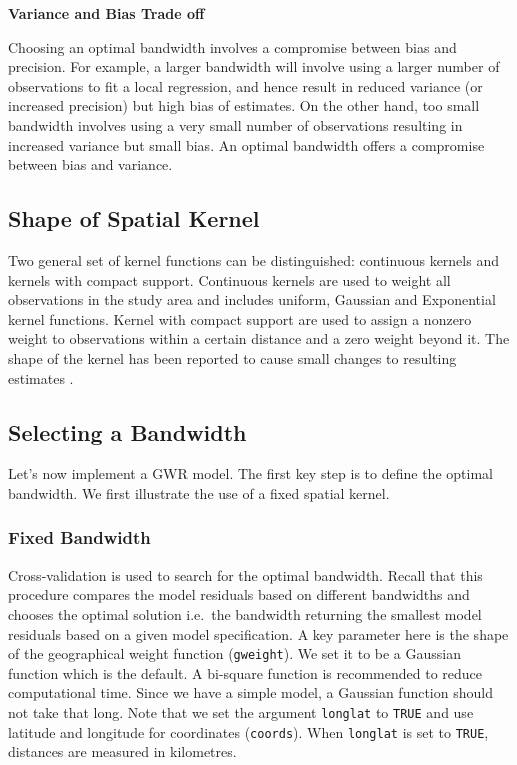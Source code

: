 \documentclass[
]{book}
\begin{document}
\textbf{Variance and Bias Trade off}

Choosing an optimal bandwidth involves a compromise between bias and precision. For example, a larger bandwidth will involve using a larger number of observations to fit a local regression, and hence result in reduced variance (or increased precision) but high bias of estimates. On the other hand, too small bandwidth involves using a very small number of observations resulting in increased variance but small bias. An optimal bandwidth offers a compromise between bias and variance.

\hypertarget{shape-of-spatial-kernel}{%
\subsection{Shape of Spatial Kernel}\label{shape-of-spatial-kernel}}

Two general set of kernel functions can be distinguished: continuous kernels and kernels with compact support. Continuous kernels are used to weight all observations in the study area and includes uniform, Gaussian and Exponential kernel functions. Kernel with compact support are used to assign a nonzero weight to observations within a certain distance and a zero weight beyond it. The shape of the kernel has been reported to cause small changes to resulting estimates \citep{brunsdon1998geographically}.

\hypertarget{selecting-a-bandwidth}{%
\subsection{Selecting a Bandwidth}\label{selecting-a-bandwidth}}

Let's now implement a GWR model. The first key step is to define the optimal bandwidth. We first illustrate the use of a fixed spatial kernel.

\hypertarget{fixed-bandwidth}{%
\subsubsection{Fixed Bandwidth}\label{fixed-bandwidth}}

Cross-validation is used to search for the optimal bandwidth. Recall that this procedure compares the model residuals based on different bandwidths and chooses the optimal solution i.e.~the bandwidth returning the smallest model residuals based on a given model specification. A key parameter here is the shape of the geographical weight function (\texttt{gweight}). We set it to be a Gaussian function which is the default. A bi-square function is recommended to reduce computational time. Since we have a simple model, a Gaussian function should not take that long. Note that we set the argument \texttt{longlat} to \texttt{TRUE} and use latitude and longitude for coordinates (\texttt{coords}). When \texttt{longlat} is set to \texttt{TRUE}, distances are measured in kilometres.
\end{document}
